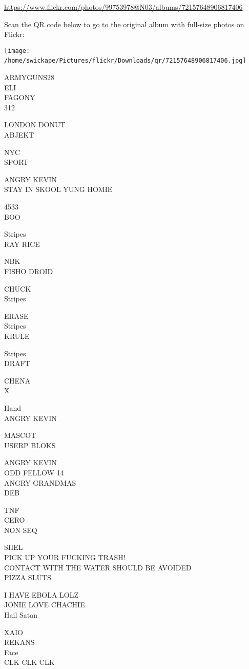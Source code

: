\documentclass[10pt,letterpaper]{article}
\begin{document}
\url{https://www.flickr.com/photos/99753978@N03/albums/72157648906817406}

Scan the QR code below to go to the original album with full-size photos on Flickr:

\texttt{[image: /home/swickape/Pictures/flickr/Downloads/qr/72157648906817406.jpg]}
\

ARMYGUNS28\\
ELI\\
FAGONY\\
312

LONDON DONUT\\
ABJEKT

NYC\\
SPORT

ANGRY KEVIN\\
STAY IN SKOOL YUNG HOMIE

4533\\
BOO

Stripes\\
RAY RICE

NBK\\
FISHO DROID

CHUCK\\
Stripes

ERASE\\
Stripes\\
KRULE

Stripes\\
DRAFT

CHENA\\
X

Hand\\
ANGRY KEVIN

MASCOT\\
USERP BLOKS

ANGRY KEVIN\\
ODD FELLOW 14\\
ANGRY GRANDMAS\\
DEB

TNF\\
CERO\\
NON SEQ

SHEL\\
PICK UP YOUR FUCKING TRASH!\\
CONTACT WITH THE WATER SHOULD BE AVOIDED\\
PIZZA SLUTS

I HAVE EBOLA LOLZ\\
JONIE LOVE CHACHIE\\
Hail Satan

XAIO\\
REKANS\\
Face\\
CLK CLK CLK
\end{document}
